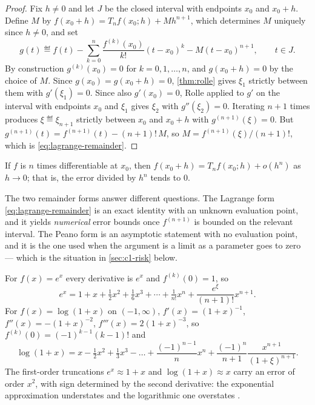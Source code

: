 \begin{proof}
	Fix $h\neq0$ and let $J$ be the closed interval with endpoints $x_0$ and
	$x_0+h$. Define $M$ by
	$f(x_0+h)=T_nf(x_0;h)+M h^{n+1}$, which determines $M$ uniquely since
	$h\neq0$, and set
	\[
		g(t)\eqdef f(t)-\sum_{k=0}^{n}\frac{f^{(k)}(x_0)}{k!}(t-x_0)^k-M(t-x_0)^{n+1},
		\qquad t\in J .
	\]
	By construction $g^{(k)}(x_0)=0$ for $k=0,1,\dots,n$, and $g(x_0+h)=0$ by the
	choice of $M$. Since $g(x_0)=g(x_0+h)=0$, \autoref{thm:rolle} gives
	$\xi_1$ strictly between them with $g'(\xi_1)=0$. Since also $g'(x_0)=0$,
	Rolle applied to $g'$ on the interval with endpoints $x_0$ and $\xi_1$ gives
	$\xi_2$ with $g''(\xi_2)=0$. Iterating $n+1$ times produces
	$\xi\eqdef\xi_{n+1}$ strictly between $x_0$ and $x_0+h$ with
	$g^{(n+1)}(\xi)=0$. But $g^{(n+1)}(t)=f^{(n+1)}(t)-(n+1)!\,M$, so
	$M=f^{(n+1)}(\xi)/(n+1)!$, which is \eqref{eq:lagrange-remainder}.
\end{proof}

\begin{corollary}\label{cor:peano}
	If $f$ is $n$ times differentiable at $x_0$, then
	$f(x_0+h)=T_nf(x_0;h)+o(h^n)$ as $h\to0$; that is, the error divided by $h^n$
	tends to $0$.
\end{corollary}

The two remainder forms answer different questions. The Lagrange form
\eqref{eq:lagrange-remainder} is an exact identity with an unknown evaluation
point, and it yields \emph{numerical} error bounds once $f^{(n+1)}$ is bounded on
the relevant interval. The Peano form is an asymptotic statement with no
evaluation point, and it is the one used when the argument is a limit as a
parameter goes to zero --- which is the situation in
\autoref{sec:c1-risk} below.

\begin{eg}\label{eg:taylor-exp-log}
	For $f(x)=e^x$ every derivative is $e^x$ and $f^{(k)}(0)=1$, so
	\[
		e^x=1+x+\tfrac12x^2+\tfrac16x^3+\cdots+\tfrac{1}{n!}x^n
		+\frac{e^{\xi}}{(n+1)!}x^{n+1}.
	\]
	For $f(x)=\log(1+x)$ on $(-1,\infty)$, $f'(x)=(1+x)^{-1}$,
	$f''(x)=-(1+x)^{-2}$, $f'''(x)=2(1+x)^{-3}$, so $f^{(k)}(0)=(-1)^{k-1}(k-1)!$
	and
	\[
		\log(1+x)=x-\tfrac12x^2+\tfrac13x^3-\dots
		+\frac{(-1)^{n-1}}{n}x^{n}+\frac{(-1)^{n}}{n+1}\frac{x^{n+1}}{(1+\xi)^{n+1}}.
	\]
	The first-order truncations $e^x\approx1+x$ and $\log(1+x)\approx x$ carry an
	error of order $x^2$, with sign determined by the second derivative: the
	exponential approximation understates and the logarithmic one overstates
	\autocite[slides 32--36]{fukuda2026calculus}.
\end{eg}

